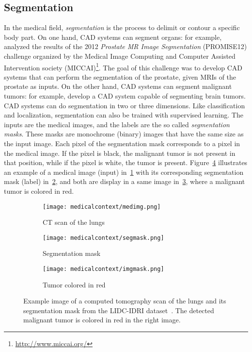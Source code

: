 \subsection{Segmentation}
\label{sec:cadsegtask}
In the medical field, \emph{segmentation} is the process to delimit or contour a specific body part. On one hand, CAD systems can segment organs: for example, \citet{litjens_evaluation_2014} analyzed the results of the 2012 \emph{Prostate MR Image Segmentation} (PROMISE12) challenge organized by the Medical Image Computing and Computer Assisted Intervention society (MICCAI)\footnote{\url{http://www.miccai.org/}}. The goal of this challenge was to develop CAD systems that can perform the segmentation of the prostate, given MRIs of the prostate as inputs. On the other hand, CAD systems can segment malignant tumors: for example, \citet{wang_transbts_2021} develop a CAD system capable of segmenting brain tumors. CAD systems can do segmentation in two or three dimensions. Like classification and localization, segmentation can also be trained with supervised learning. The inputs are the medical images, and the labels are the so called \emph{segmentation masks}. These masks are monochrome (binary) images that have the same size as the input image. Each pixel of the segmentation mask corresponds to a pixel in the medical image. If the pixel is black, the malignant tumor is not present in that position, while if the pixel is white, the tumor is present. Figure~\ref{fig:segmaskimg} illustrates an example of a medical image (input) in~\ref{fig:segmaskimg1} with its corresponding segmentation mask (label) in~\ref{fig:segmaskimg2}, and both are display in a same image in~\ref{fig:segmaskimg3}, where a malignant tumor is colored in red.

\begin{figure}[t!]
     \centering
     \begin{subfigure}[b]{0.32\textwidth}
         \centering
         \texttt{[image: medicalcontext/medimg.png]}
         \caption{CT scan of the lungs}
         \label{fig:segmaskimg1}
     \end{subfigure}
     \hfill
     \begin{subfigure}[b]{0.32\textwidth}
         \centering
         \texttt{[image: medicalcontext/segmask.png]}
         \caption{Segmentation mask}
         \label{fig:segmaskimg2}
     \end{subfigure}
     \hfill
     \begin{subfigure}[b]{0.32\textwidth}
         \centering
         \texttt{[image: medicalcontext/imgmask.png]}
         \caption{Tumor colored in red}
         \label{fig:segmaskimg3}
     \end{subfigure}
        \caption[Computed tomography scan of the lungs and its segmentation mask]{Example image of a computed tomography scan of the lungs and its segmentation mask from the LIDC-IDRI dataset~\cite{armato_data_2015}. The detected malignant tumor is colored in red in the right image.}
        \label{fig:segmaskimg}
\end{figure}


